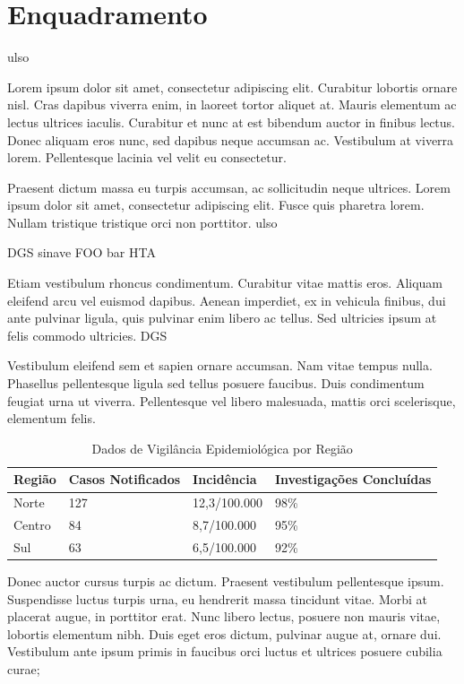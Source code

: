 \section{Enquadramento}\label{sec:enquadramento}

\gls{ulso}

Lorem ipsum dolor sit amet, consectetur adipiscing elit. Curabitur lobortis ornare nisl. Cras dapibus viverra enim, in laoreet tortor aliquet at. Mauris elementum ac lectus ultrices iaculis. Curabitur et nunc at est bibendum auctor in finibus lectus. Donec aliquam eros nunc, sed dapibus neque accumsan ac. Vestibulum at viverra lorem. Pellentesque lacinia vel velit eu consectetur.  

Praesent dictum massa eu turpis accumsan, ac sollicitudin neque ultrices. Lorem ipsum dolor sit amet, consectetur adipiscing elit. Fusce quis pharetra lorem. Nullam tristique tristique orci non porttitor. \gls{ulso}

\gls{DGS}
\gls{sinave}
\gls{FOO}
\gls{bar}
\gls{HTA}

Etiam vestibulum rhoncus condimentum. Curabitur vitae mattis eros. Aliquam eleifend arcu vel euismod dapibus. Aenean imperdiet, ex in vehicula finibus, dui ante pulvinar ligula, quis pulvinar enim libero ac tellus. Sed ultricies ipsum at felis commodo ultricies. \acrshort{DGS}

Vestibulum eleifend sem et sapien ornare accumsan. Nam vitae tempus nulla. Phasellus pellentesque ligula sed tellus posuere faucibus. Duis condimentum feugiat urna ut viverra. Pellentesque vel libero malesuada, mattis orci scelerisque, elementum felis. \cite{apa_faq_2018}

\begin{table}[htbp]
\caption{Dados de Vigilância Epidemiológica por Região}
\label{tab:dados-vigilancia}
\centering
\begin{tabular}{|p{3cm}|p{3cm}|p{3cm}|p{3cm}|}
\hline
\rowcolor{tableheader} 
\textbf{Região} & \textbf{Casos Notificados} & \textbf{Incidência} & \textbf{Investigações Concluídas} \\
\hline
Norte & 127 & 12,3/100.000 & 98\% \\
\hline
Centro & 84 & 8,7/100.000 & 95\% \\
\hline
Sul & 63 & 6,5/100.000 & 92\% \\
\hline
\end{tabular}
\end{table}



Donec auctor cursus turpis ac dictum. Praesent vestibulum pellentesque ipsum. Suspendisse luctus turpis urna, eu hendrerit massa tincidunt vitae. Morbi at placerat augue, in porttitor erat. Nunc libero lectus, posuere non mauris vitae, lobortis elementum nibh. Duis eget eros dictum, pulvinar augue at, ornare dui. Vestibulum ante ipsum primis in faucibus orci luctus et ultrices posuere cubilia curae;\cite{decreto-lei_46-2008}

